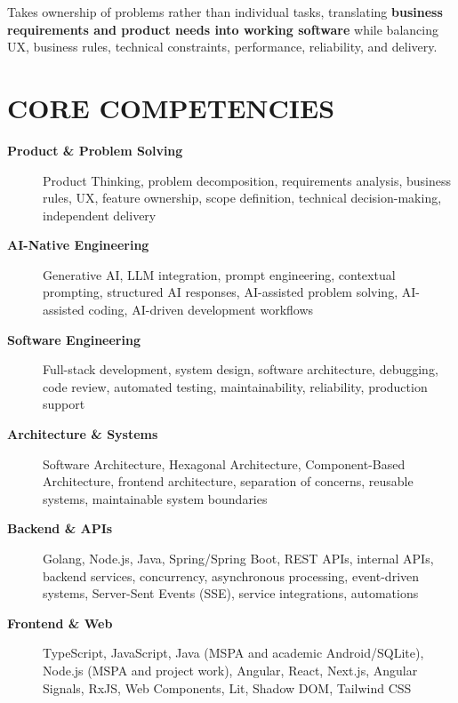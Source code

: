 \documentclass[10pt,a4paper]{article}
\begin{document}
Takes ownership of problems rather than individual tasks, translating
\textbf{business requirements and product needs into working software}
while balancing UX, business rules, technical constraints,
performance, reliability, and delivery.


\section*{CORE COMPETENCIES}

\footnotesize

\begin{description}

    \item[\textbf{Product \& Problem Solving}]
    Product Thinking, problem decomposition, requirements analysis,
    business rules, UX, feature ownership, scope definition,
    technical decision-making, independent delivery

    \item[\textbf{AI-Native Engineering}]
    Generative AI, LLM integration, prompt engineering,
    contextual prompting, structured AI responses,
    AI-assisted problem solving, AI-assisted coding,
    AI-driven development workflows

    \item[\textbf{Software Engineering}]
    Full-stack development, system design, software architecture,
    debugging, code review, automated testing, maintainability,
    reliability, production support

    \item[\textbf{Architecture \& Systems}]
    Software Architecture, Hexagonal Architecture,
    Component-Based Architecture, frontend architecture,
    separation of concerns, reusable systems,
    maintainable system boundaries

    \item[\textbf{Backend \& APIs}]
    Golang, Node.js, Java, Spring/Spring Boot, REST APIs, internal APIs, backend services,
    concurrency, asynchronous processing, event-driven systems,
    Server-Sent Events (SSE), service integrations, automations

    \item[\textbf{Frontend \& Web}]
    TypeScript, JavaScript, Java (MSPA and academic Android/SQLite), Node.js (MSPA and project work), Angular, React, Next.js,
    Angular Signals, RxJS, Web Components, Lit,
    Shadow DOM, Tailwind CSS


\end{description}
\end{document}
